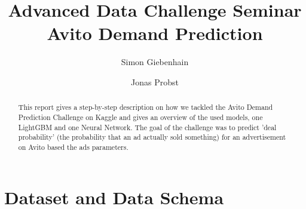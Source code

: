 \documentclass[runningheads]{llncs}
\begin{document}
%
\title{Advanced Data Challenge Seminar\\
		Avito Demand Prediction}
%

%
\author{Simon Giebenhain \and Jonas Probst}
%

%
%
\maketitle              %
%
\begin{abstract}
This report gives a step-by-step description on how we tackled the Avito Demand Prediction Challenge on Kaggle and gives an overview of the used models, one LightGBM and one Neural Network. The goal of the challenge was to predict 'deal probability' (the probability that an ad actually sold something) for an advertisement on Avito based the ads parameters. 

\end{abstract}
%
%
%
\section{Dataset and Data Schema}
\end{document}
